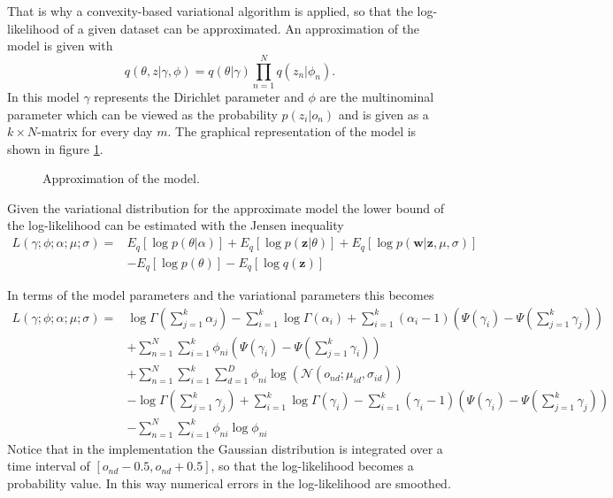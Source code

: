 That is why a convexity-based variational algorithm is applied, so that the log-likelihood of a given dataset can be approximated. 
An approximation of the model is given with 
  \begin{equation}
   q(\theta,z|\gamma,\phi) = q(\theta|\gamma) \prod_{n=1}^N q(z_n|\phi_n).
  \end{equation}
In this model $\gamma$ represents the Dirichlet parameter and $\phi$ are the multinominal parameter which can be viewed as the probability $p(z_i|o_n)$ and is given as a $k \times N$-matrix for every day $m$. The graphical representation of the model is shown in figure \ref{fig:ModelApprox}.
  
 
\begin{figure}[h!]
\centering
\def\svgwidth{0.4\textwidth}

\caption{Approximation of the model.}
\label{fig:ModelApprox}
\end{figure}
 
  
  
  
  Given the variational distribution for the approximate model the lower bound of the log-likelihood can be estimated with the Jensen inequality
  \begin{equation}
   \begin{split}
    L(\gamma;\phi;\alpha;\mu;\sigma) =& E_q[\log p(\theta|\alpha)] + E_q[\log p(\textbf{z}|\theta)] + E_q[\log p(\textbf{w}|\textbf{z},\mu,\sigma)] \\
   & -E_q[\log p(\theta)] - E_q[\log q(\textbf{z})]
   \end{split}
  \end{equation}

In terms of the model parameters and the variational parameters this becomes
\begin{equation}
  \begin{split}
 L(\gamma;\phi;\alpha;\mu;\sigma) =& \log \Gamma (\sum_{j=1}^k \alpha_j) - \sum_{i=1}^k \log \Gamma(\alpha_i) + \sum_{i=1}^k (\alpha_i-1)(\Psi(\gamma_i)-\Psi(\sum_{j=1}^k \gamma_j)) \\
 & + \sum_{n=1}^N \sum_{i=1}^k \phi_{ni} (\Psi(\gamma_i)-\Psi(\sum_{j=1}^k \gamma_i)) \\
  & + \sum_{n=1}^N \sum_{i=1}^k \sum_{d=1}^D \phi_{ni} \log( \mathcal{N}(o_{nd};\mu_{id},\sigma_{id})) \\
  & - \log \Gamma (\sum_{j=1}^k \gamma_j) + \sum_{i=1}^k \log \Gamma (\gamma_i) - \sum_{i=1}^k (\gamma_i -1)(\Psi(\gamma_i)-\Psi(\sum_{j=1}^k \gamma_j)) \\
 & - \sum_{n=1}^N \sum_{i=1}^k \phi_{ni} \log \phi_{ni}
  \end{split}
  \label{eq:likeli}
\end{equation}
Notice that in the implementation the Gaussian distribution is integrated over a time interval of $[{o_{nd}-0.5},{o_{nd}+0.5}]$, so that the log-likelihood becomes a probability value. In this way numerical errors in the log-likelihood are smoothed.\\

